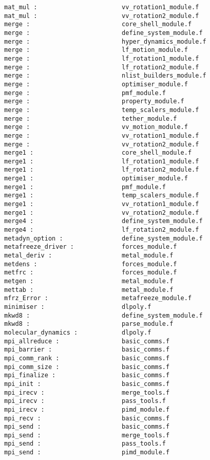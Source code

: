 \begin{verbatim}
mat_mul :                       vv_rotation1_module.f
mat_mul :                       vv_rotation2_module.f
merge :                         core_shell_module.f
merge :                         define_system_module.f
merge :                         hyper_dynamics_module.f
merge :                         lf_motion_module.f
merge :                         lf_rotation1_module.f
merge :                         lf_rotation2_module.f
merge :                         nlist_builders_module.f
merge :                         optimiser_module.f
merge :                         pmf_module.f
merge :                         property_module.f
merge :                         temp_scalers_module.f
merge :                         tether_module.f
merge :                         vv_motion_module.f
merge :                         vv_rotation1_module.f
merge :                         vv_rotation2_module.f
merge1 :                        core_shell_module.f
merge1 :                        lf_rotation1_module.f
merge1 :                        lf_rotation2_module.f
merge1 :                        optimiser_module.f
merge1 :                        pmf_module.f
merge1 :                        temp_scalers_module.f
merge1 :                        vv_rotation1_module.f
merge1 :                        vv_rotation2_module.f
merge4 :                        define_system_module.f
merge4 :                        lf_rotation2_module.f
metadyn_option :                define_system_module.f
metafreeze_driver :             forces_module.f
metal_deriv :                   metal_module.f
metdens :                       forces_module.f
metfrc :                        forces_module.f
metgen :                        metal_module.f
mettab :                        metal_module.f
mfrz_Error :                    metafreeze_module.f
minimiser :                     dlpoly.f
mkwd8 :                         define_system_module.f 
mkwd8 :                         parse_module.f 
molecular_dynamics :            dlpoly.f
mpi_allreduce :                 basic_comms.f
mpi_barrier :                   basic_comms.f
mpi_comm_rank :                 basic_comms.f
mpi_comm_size :                 basic_comms.f
mpi_finalize :                  basic_comms.f
mpi_init :                      basic_comms.f
mpi_irecv :                     merge_tools.f
mpi_irecv :                     pass_tools.f
mpi_irecv :                     pimd_module.f
mpi_recv :                      basic_comms.f
mpi_send :                      basic_comms.f
mpi_send :                      merge_tools.f
mpi_send :                      pass_tools.f
mpi_send :                      pimd_module.f

\end{verbatim}
